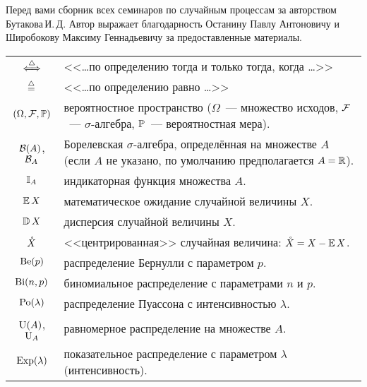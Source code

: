  \label{sec:intro}

Перед вами сборник всех семинаров по случайным процессам за авторством Бутакова\,И.\,Д.
Автор выражает благодарность Останину Павлу Антоновичу и Широбокову Максиму Геннадьевичу за предоставленные материалы.


\begin{center}
    \begin{tabularx}{\textwidth}{cl}
        $ \overset{\triangle}{\Longleftrightarrow} $                      & <<\ldots по определению тогда и только тогда, когда \ldots>> \\
        $ \overset{\triangle}{=} $                       & <<\ldots по определению равно \ldots>> \\
        \rule{0pt}{16pt}%
        $ (\Omega, \mathcal{F}, \mathbb{P}) $ & \makecell[l]{вероятностное пространство ($ \Omega $~--- множество исходов, $ \mathcal{F} $~--- $ \sigma $-алгебра, \\ $ \mathbb{P} $~--- вероятностная мера).} \\
        $ \mathcal{B}(A) $, $ \mathcal{B}_A $      & \makecell[l]{Борелевская $ \sigma $-алгебра, определённая на множестве $ A $ (если $ A $ не указано, \\ по умолчанию предполагается $ A = \mathbb{R} $).} \\
        $ \mathbb{I}_A $                 & индикаторная функция множества $ A $. \\
        $ \operatorname{\mathbb{E}} X $                    & математическое ожидание случайной величины $ X $. \\
        $ \operatorname{\mathbb{D}} X $                & дисперсия случайной величины $ X $. \\
        $ \mathring{X} $                  & <<центрированная>> случайная величина: $ \mathring{X} = X - \operatorname{\mathbb{E}} X $. \\
        \rule{0pt}{16pt}%
        $ \textnormal{Be}(p) $                & распределение Бернулли с параметром $ p $. \\
        $ \textnormal{Bi}(n, p) $              & биномиальное распределение с параметрами $ n $ и $ p $. \\
        $ \textnormal{Po}(\lambda) $            & распределение Пуассона с интенсивностью $ \lambda $. \\
        $ \textnormal{U}(A)$, $ \textnormal{U}_A $   & равномерное распределение на множестве $ A $. \\
        $ \textnormal{Exp}(\lambda) $           & показательное распределение с параметром $ \lambda $ (интенсивность). \\

\end{tabularx}
\end{center}
